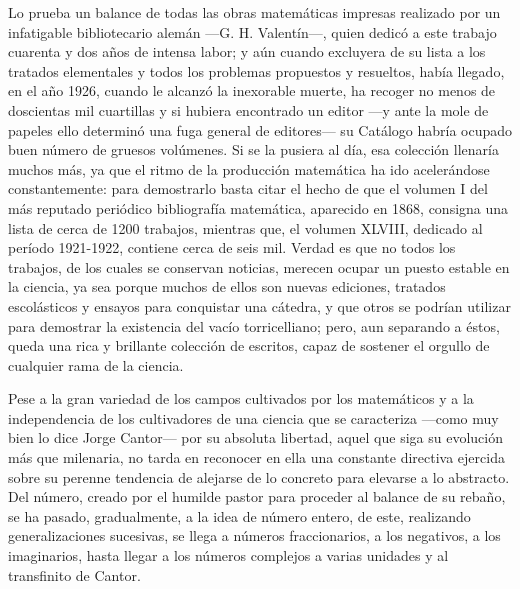\documentclass[a4paper, 12pt, draft]{article}
\begin{document}
{{Lo prueba un balance de todas las obras matemáticas impresas realizado por un infatigable bibliotecario alemán ---G. H. Valentín---, quien dedicó a este trabajo cuarenta y dos años de intensa labor; y aún cuando excluyera de su lista a los tratados elementales y todos los problemas propuestos y resueltos, había llegado, en el año 1926, cuando le
alcanzó la inexorable muerte, ha recoger no menos de doscientas mil cuartillas y si hubiera encontrado un editor ---y ante la mole de papeles ello determinó una fuga general de editores--- su Catálogo habría ocupado buen número de gruesos volúmenes. Si se la pusiera al día, esa colección llenaría muchos más, ya que el ritmo de la producción matemática ha ido acelerándose constantemente: para demostrarlo basta citar el hecho de que el volumen I del más reputado periódico bibliografía matemática, aparecido en 1868, consigna una lista de cerca de 1200 trabajos, mientras que, el volumen XLVIII, dedicado al período 1921-1922, contiene cerca de seis mil. Verdad es que no todos los trabajos, de los cuales se conservan noticias, merecen ocupar un puesto estable en la ciencia, ya sea porque muchos de ellos son nuevas ediciones, tratados escolásticos y ensayos para conquistar una cátedra, y que otros se podrían utilizar para demostrar la existencia del vacío torricelliano; pero, aun separando a éstos, queda una rica y brillante colección de escritos, capaz de sostener el orgullo de cualquier rama de la ciencia.



Pese a la gran variedad de los campos cultivados por los matemáticos y a la independencia de los cultivadores de una ciencia que se caracteriza ---como muy bien lo dice Jorge Cantor--- por su absoluta libertad, aquel que siga su evolución más que milenaria, no tarda en reconocer en ella una constante directiva ejercida sobre su perenne tendencia de alejarse de lo concreto para elevarse a lo abstracto. Del número, creado por el humilde pastor para proceder al balance de su rebaño, se ha pasado, gradualmente, a la idea de número entero, de este, realizando generalizaciones  sucesivas, se llega a números fraccionarios, a los negativos, a los imaginarios, hasta llegar a los números complejos a varias unidades y al transfinito de Cantor.

}}
\end{document}
